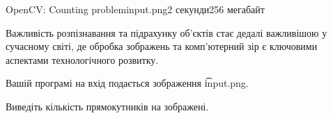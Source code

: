 \begin{problem}{OpenCV: Counting problem}{input.png}{}{2 секунди}{256 мегабайт}

Важливість розпізнавання та підрахунку об'єктів стає дедалі важливішою у сучасному світі, 
де обробка зображень та комп'ютерний зір є ключовими аспектами технологічного розвитку.



\InputFile
Вашій програмі на вхід подається зображення  \t{input.png}.  

\OutputFile
Виведіть кількість прямокутників на зображені.

\Constraints


\Examples
\begin{example}
%
\end{example}

\end{problem}

